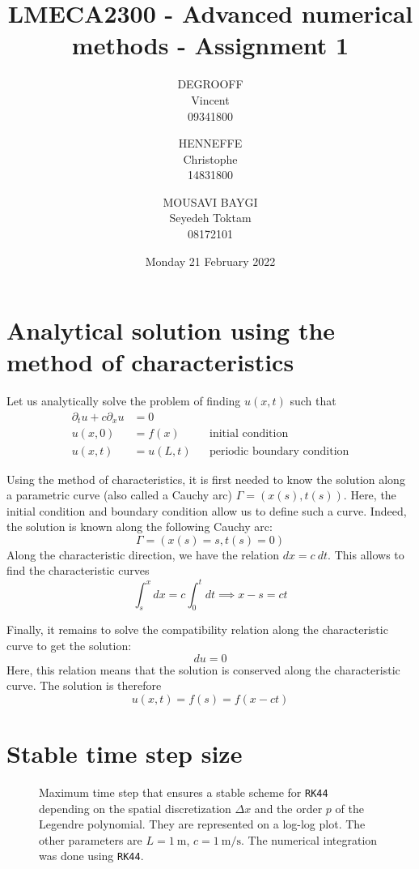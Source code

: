 \documentclass[11 pt]{article}
\title{LMECA2300 - Advanced numerical methods - Assignment 1}
\author{
    DEGROOFF\\ Vincent\\ 09341800
    \and
    HENNEFFE\\ Christophe\\ 14831800
    \and
    MOUSAVI BAYGI\\ Seyedeh Toktam\\ 08172101
}
\date{Monday 21 February 2022}
\begin{document}
\maketitle

\section{Analytical solution using the method of characteristics}

Let us analytically solve the problem of finding $u(x,t)$ such that
\begin{align*}
    \partial_t u + c \partial_x u &= 0\\[2pt]
    u(x,0) &= f(x) && \text{initial condition}\\[2pt]
    u(x,t) &= u(L,t) && \text{periodic boundary condition}
\end{align*}

Using the method of characteristics, it is first needed to know the solution along a parametric curve (also called a Cauchy arc) $\Gamma = (x(s), t(s))$. Here, the initial condition and boundary condition allow us to define such a curve. Indeed, the solution is known along the following Cauchy arc:
\[\Gamma = (x(s) = s, t(s) = 0)\]
Along the characteristic direction, we have the relation $dx = c~dt$. This allows to find the characteristic curves
\[\int_{s}^{x}dx = c\int_{0}^{t}dt \implies x-s = ct\]

Finally, it remains to solve the compatibility relation along the characteristic curve to get the solution:
\[du = 0\]
Here, this relation means that the solution is conserved along the characteristic curve. The solution is therefore
\[u(x,t) = f(s) = f(x-ct)\]

\section{Stable time step size}
\begin{figure}[htbp]
    \centering
    
    \caption{Maximum time step that ensures a stable scheme for \texttt{RK44} depending on the spatial discretization $\Delta x$ and the order $p$ of the Legendre polynomial. They are represented on a log-log plot. The other parameters are $L=\qty[per-mode = symbol]{1}{\m}$, $c=\qty[per-mode = symbol]{1}{\m\per\s}$. The numerical integration was done using \texttt{RK44}.}
    \label{fig:step_size}
\end{figure}
\end{document}
